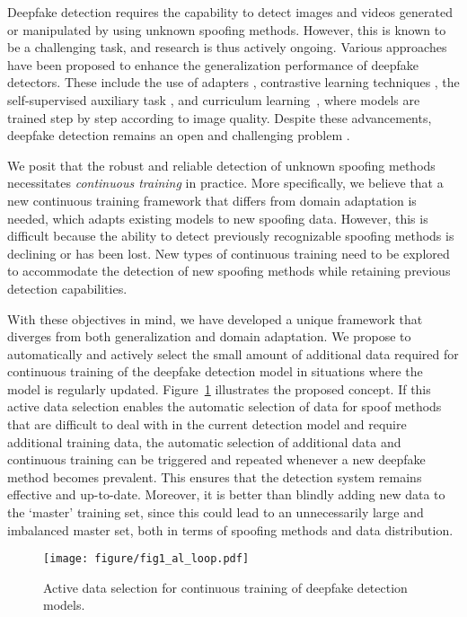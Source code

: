\documentclass[english]{lni}
\begin{document}
Deepfake detection requires the capability to detect images and videos generated or manipulated by using unknown spoofing methods. However, this is known to be a challenging task, and research is thus actively ongoing. Various approaches have been proposed to enhance the generalization performance of deepfake detectors. These include the use of adapters \cite{liu2024forgery}, contrastive learning techniques \cite{dong2023contrastive, larue2023seeable}, the self-supervised auxiliary task \cite{das2024limited}, and curriculum learning~\cite{song2024towards}, where models are trained step by step according to image quality. Despite these advancements, deepfake detection remains an open and challenging problem \cite{yan2024deepfakebench}. 

We posit that the robust and reliable detection of unknown spoofing methods necessitates \textit{continuous training} \cite{ma2021continual} in practice. More specifically, we believe that a new continuous training framework that differs from domain adaptation is needed, which adapts existing models to new spoofing data. However, this is difficult because the ability to detect previously recognizable spoofing methods is declining or has been lost. New types of continuous training need to be explored to accommodate the detection of new spoofing methods while retaining previous detection capabilities.

With these objectives in mind, we have developed a unique framework that diverges from both generalization and domain adaptation. We propose to automatically and actively select the small amount of additional data required for continuous training of the deepfake detection model in situations where the model is regularly updated. Figure~\ref{fig:idea} illustrates the proposed concept. If this active data selection enables the automatic selection of data for spoof methods that are difficult to deal with in the current detection model and require additional training data, the automatic selection of additional data and continuous training can be triggered and repeated whenever a new deepfake method becomes prevalent. This ensures that the detection system remains effective and up-to-date. Moreover, it is better than blindly adding new data to the `master' training set, since this could lead to an unnecessarily large and imbalanced master set, both in terms of spoofing methods and data distribution.

\begin{figure}[t]
\centering
\texttt{[image: figure/fig1\_al\_loop.pdf]}
\caption{Active data selection for continuous training of deepfake detection models.}  
\label{fig:idea}
\end{figure}
\end{document}
